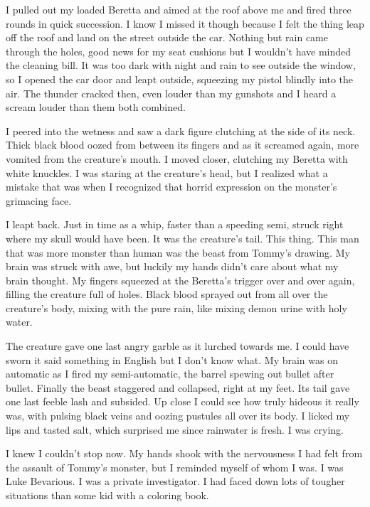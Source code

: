 I pulled out my loaded Beretta and aimed at the roof above me and
fired three rounds in quick succession. I know I missed it though
because I felt the thing leap off the roof and land on the street
outside the car. Nothing but rain came through the holes, good news
for my seat cushions but I wouldn't have minded the cleaning
bill. It was too dark with night and rain to see outside the
window, so I opened the car door and leapt outside, squeezing my
pistol blindly into the air. The thunder cracked then, even louder
than my gunshots and I heard a scream louder than them both
combined.



I peered into the wetness and saw a dark figure clutching at the
side of its neck. Thick black blood oozed from between its fingers
and as it screamed again, more vomited from the creature's
mouth. I moved closer, clutching my Beretta with white knuckles. I
was staring at the creature's head, but I realized what a
mistake that was when I recognized that horrid expression on the
monster's grimacing face.



I leapt back. Just in time as a whip, faster than a speeding semi,
struck right where my skull would have been. It was the
creature's tail. This thing. This man that was more monster
than human was the beast from Tommy's drawing. My brain was
struck with awe, but luckily my hands didn't care about what
my brain thought. My fingers squeezed at the Beretta's
trigger over and over again, filling the creature full of holes.
Black blood sprayed out from all over the creature's body,
mixing with the pure rain, like mixing demon urine with holy
water.



The creature gave one last angry garble as it lurched towards me. I
could have sworn it said something in English but I don't
know what. My brain was on automatic as I fired my semi-automatic,
the barrel spewing out bullet after bullet. Finally the beast
staggered and collapsed, right at my feet. Its tail gave one last
feeble lash and subsided. Up close I could see how truly hideous it
really was, with pulsing black veins and oozing pustules all over
its body. I licked my lips and tasted salt, which surprised me
since rainwater is fresh. I was crying.



I knew I couldn't stop now. My hands shook with the
nervousness I had felt from the assault of Tommy's monster,
but I reminded myself of whom I was. I was Luke Bevarious. I was a
private investigator. I had faced down lots of tougher situations
than some kid with a coloring book.



